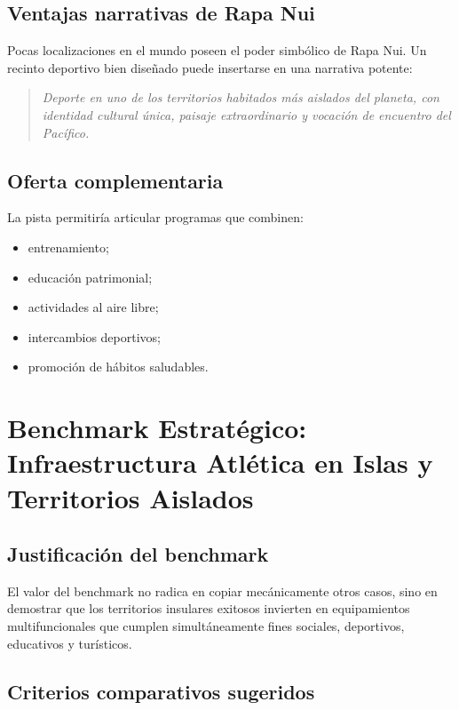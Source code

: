 \documentclass[12pt,letterpaper]{article}
\begin{document}
\subsection{Ventajas narrativas de Rapa Nui}

Pocas localizaciones en el mundo poseen el poder simbólico de Rapa Nui. Un recinto deportivo bien diseñado puede insertarse en una narrativa potente:

\begin{quote}
\textit{Deporte en uno de los territorios habitados más aislados del planeta, con identidad cultural única, paisaje extraordinario y vocación de encuentro del Pacífico.}
\end{quote}

\subsection{Oferta complementaria}

La pista permitiría articular programas que combinen:

\begin{itemize}
    \item entrenamiento;
    \item educación patrimonial;
    \item actividades al aire libre;
    \item intercambios deportivos;
    \item promoción de hábitos saludables.
\end{itemize}

\section{Benchmark Estratégico: Infraestructura Atlética en Islas y Territorios Aislados}

\subsection{Justificación del benchmark}

El valor del benchmark no radica en copiar mecánicamente otros casos, sino en demostrar que los territorios insulares exitosos invierten en equipamientos multifuncionales que cumplen simultáneamente fines sociales, deportivos, educativos y turísticos.

\subsection{Criterios comparativos sugeridos}
\end{document}
